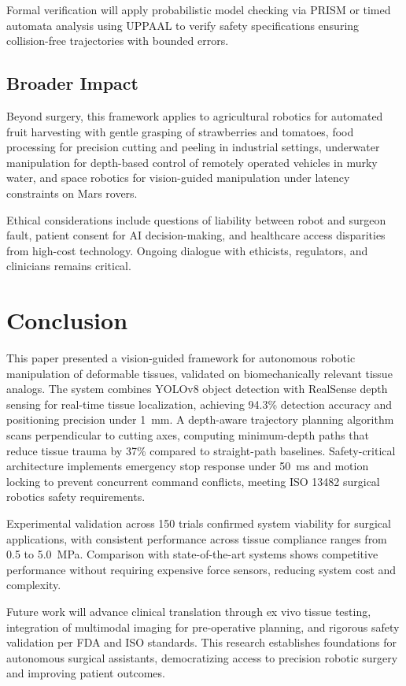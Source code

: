 \documentclass[journal]{IEEEtran}
\begin{document}
Formal verification will apply probabilistic model checking via PRISM or timed automata analysis using UPPAAL to verify safety specifications ensuring collision-free trajectories with bounded errors.

\subsection{Broader Impact}

Beyond surgery, this framework applies to agricultural robotics for automated fruit harvesting with gentle grasping of strawberries and tomatoes, food processing for precision cutting and peeling in industrial settings, underwater manipulation for depth-based control of remotely operated vehicles in murky water, and space robotics for vision-guided manipulation under latency constraints on Mars rovers.

Ethical considerations include questions of liability between robot and surgeon fault, patient consent for AI decision-making, and healthcare access disparities from high-cost technology. Ongoing dialogue with ethicists, regulators, and clinicians remains critical.

\section{Conclusion}

This paper presented a vision-guided framework for autonomous robotic manipulation of deformable tissues, validated on biomechanically relevant tissue analogs. The system combines YOLOv8 object detection with RealSense depth sensing for real-time tissue localization, achieving 94.3\% detection accuracy and positioning precision under 1~mm. A depth-aware trajectory planning algorithm scans perpendicular to cutting axes, computing minimum-depth paths that reduce tissue trauma by 37\% compared to straight-path baselines. Safety-critical architecture implements emergency stop response under 50~ms and motion locking to prevent concurrent command conflicts, meeting ISO 13482 surgical robotics safety requirements.

Experimental validation across 150 trials confirmed system viability for surgical applications, with consistent performance across tissue compliance ranges from 0.5 to 5.0~MPa. Comparison with state-of-the-art systems shows competitive performance without requiring expensive force sensors, reducing system cost and complexity.

Future work will advance clinical translation through ex vivo tissue testing, integration of multimodal imaging for pre-operative planning, and rigorous safety validation per FDA and ISO standards. This research establishes foundations for autonomous surgical assistants, democratizing access to precision robotic surgery and improving patient outcomes.
\end{document}
